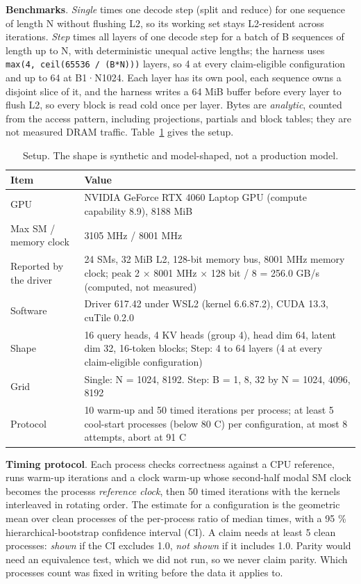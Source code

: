 \documentclass[conference]{IEEEtran}
\begin{document}
\textbf{Benchmarks}. \emph{Single} times one decode step (split and reduce) for one sequence of length N without flushing L2, so its working set stays L2-resident across iterations. \emph{Step} times all layers of one decode step for a batch of B sequences of length up to N, with deterministic unequal active lengths; the harness uses \texttt{max(4,\ ceil(65536\ /\ (B*N)))} layers, so 4 at every claim-eligible configuration and up to 64 at B1·N1024. Each layer has its own pool, each sequence owns a disjoint slice of it, and the harness writes a 64 MiB buffer before every layer to flush L2, so every block is read cold once per layer. Bytes are \emph{analytic}, counted from the access pattern, including projections, partials and block tables; they are not measured DRAM traffic. Table~\ref{tab:1} gives the setup.

\begin{table}[t]
\centering
\caption{Setup. The shape is synthetic and model-shaped, not a production model.}\label{tab:1}
\begin{tabular}{lp{}}
\toprule
Item & Value \\
\midrule
GPU & NVIDIA GeForce RTX 4060 Laptop GPU (compute capability 8.9), 8188 MiB \\
Max SM / memory clock & 3105 MHz / 8001 MHz \\
Reported by the driver & 24 SMs, 32 MiB L2, 128-bit memory bus, 8001 MHz memory clock; peak 2 × 8001 MHz × 128 bit / 8 = 256.0 GB/s (computed, not measured) \\
Software & Driver 617.42 under WSL2 (kernel 6.6.87.2), CUDA 13.3, cuTile 0.2.0 \\
Shape & 16 query heads, 4 KV heads (group 4), head dim 64, latent dim 32, 16-token blocks; Step: 4 to 64 layers (4 at every claim-eligible configuration) \\
Grid & Single: N = 1024, 8192. Step: B = 1, 8, 32 by N = 1024, 4096, 8192 \\
Protocol & 10 warm-up and 50 timed iterations per process; at least 5 cool-start processes (below 80 C) per configuration, at most 8 attempts, abort at 91 C \\
\bottomrule
\end{tabular}
\end{table}

\textbf{Timing protocol}. Each process checks correctness against a CPU reference, runs warm-up iterations and a clock warm-up whose second-half modal SM clock becomes the process\textquotesingle s \emph{reference clock}, then 50 timed iterations with the kernels interleaved in rotating order. The estimate for a configuration is the geometric mean over clean processes of the per-process ratio of median times, with a 95 \% hierarchical-bootstrap confidence interval (CI). A claim needs at least 5 clean processes: \emph{shown} if the CI excludes 1.0, \emph{not shown} if it includes 1.0. Parity would need an equivalence test, which we did not run, so we never claim parity. Which processes count was fixed in writing before the data it applies to.
\end{document}
